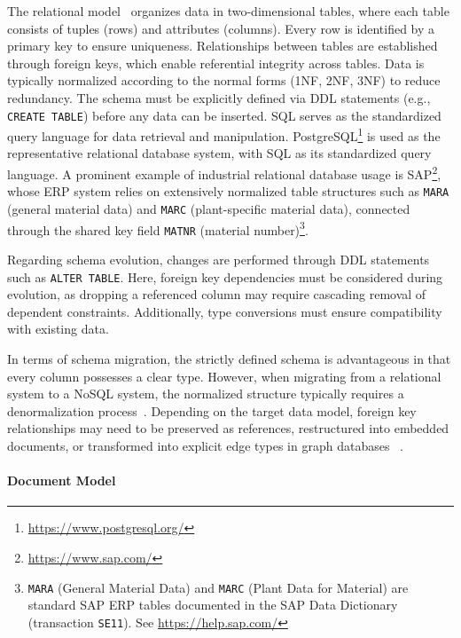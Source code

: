 The relational model~\cite{elmasri2016fundamentals} organizes data in two-dimensional tables, where each table consists of tuples (rows) and attributes (columns). Every row is identified by a primary key to ensure uniqueness. Relationships between tables are established through foreign keys, which enable referential integrity across tables. Data is typically normalized according to the normal forms (1NF, 2NF, 3NF) to reduce redundancy. The schema must be explicitly defined via DDL statements (e.g., \texttt{CREATE TABLE}) before any data can be inserted. SQL serves as the standardized query language for data retrieval and manipulation. PostgreSQL\footnote{\url{https://www.postgresql.org/}} is used as the representative relational database system, with SQL as its standardized
query language. A prominent example of industrial relational database usage is
SAP\footnote{\url{https://www.sap.com/}}, whose ERP system relies on
extensively normalized table structures such as \texttt{MARA}
(general material data) and \texttt{MARC} (plant-specific material
data), connected through the shared key field \texttt{MATNR}
(material number)\footnote{\texttt{MARA} (General Material Data) and
\texttt{MARC} (Plant Data for Material) are standard SAP ERP tables
documented in the SAP Data Dictionary (transaction \texttt{SE11}).
See \url{https://help.sap.com/}}.

Regarding schema evolution, changes are performed through DDL statements such as \texttt{ALTER TABLE}. Here, foreign key dependencies must be considered during evolution, as dropping a referenced column may require cascading removal of dependent constraints. Additionally, type conversions must ensure compatibility with existing data.

In terms of schema migration, the strictly defined schema is advantageous in that every column possesses a clear type. However, when migrating from a relational system to a NoSQL system, the normalized structure typically requires a denormalization process~\cite{zhao2014schema}.  Depending on the target data model,
foreign key relationships may need to be preserved as references,
restructured into embedded documents, or transformed into explicit
edge types in graph databases ~\cite{lee2015sql}.

\paragraph{Document Model}\quad

